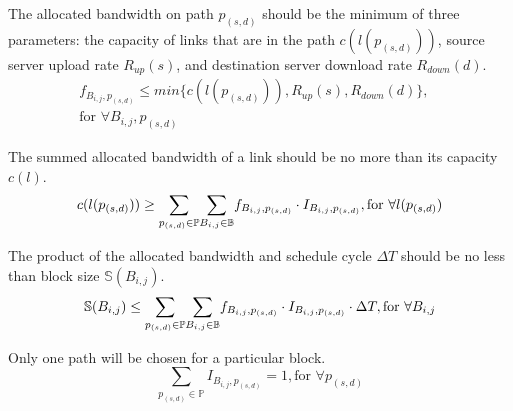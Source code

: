 \begin{packeditemize}

\item The allocated bandwidth on path $p_{(s,d)}$ should be the minimum of three parameters: the capacity of links that are in the path $c(l(p_{(s,d)}))$, source server upload rate $R_{up}(s)$, and destination server download rate $R_{down}(d)$.
\begin{equation}
\begin{split}
f_{B_{i,j},p_{(s,d)}} \leq  min \{c(l(p_{(s,d)})),R_{up}(s),R_{down}(d)\},& \\
\text{for }\forall B_{i,j}, p_{(s,d)} &
\end{split}
\end{equation}


\item The summed allocated bandwidth of a link should be no more than its capacity $c(l)$.
\begin{equation}
c(l(p_{(s,d)})) \geq  \displaystyle{\sum_{p_{(s,d)}\in \mathbb{P}}} \displaystyle{\sum_{B_{i,j} \in \mathbb{B}}} f_{B_{i,j},p_{(s,d)}} \cdot I_{B_{i,j},p_{(s,d)}}, \text{for }\forall l(p_{(s,d)})\\
\end{equation}

\item The product of the allocated bandwidth and schedule cycle $\Delta T$ should be no less than block size $\mathbb{S}(B_{i,j})$.
\begin{equation}
\mathbb{S}(B_{i,j}) \leq \displaystyle{\sum_{p_{(s,d)}\in \mathbb{P}}} \displaystyle{\sum_{B_{i,j} \in \mathbb{B}}} f_{B_{i,j},p_{(s,d)}} \cdot I_{B_{i,j},p_{(s,d)}} \cdot \Delta T, \text{for }\forall B_{i,j}\\
\end{equation}


\item Only one path will be chosen for a particular block.
\begin{equation}
\displaystyle{\sum_{p_{(s,d)} \in \mathbb{P}}} I_{B_{i,j},p_{(s,d)}} = 1, \text{for }\forall p_{(s,d)}
\end{equation}
\end{packeditemize}
